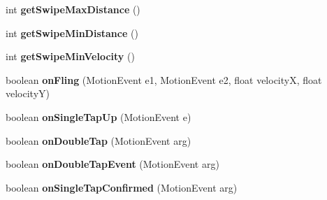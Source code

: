 \begin{DoxyCompactItemize}
\item 
\hypertarget{classcom_1_1chopin_1_1SimpleGestureFilter_a147e3bdf932d1452c54f61c6039d486a}{}int {\bfseries get\+Swipe\+Max\+Distance} ()\label{classcom_1_1chopin_1_1SimpleGestureFilter_a147e3bdf932d1452c54f61c6039d486a}

\item 
\hypertarget{classcom_1_1chopin_1_1SimpleGestureFilter_a808f7f24037e8696afa446691deeb8d6}{}int {\bfseries get\+Swipe\+Min\+Distance} ()\label{classcom_1_1chopin_1_1SimpleGestureFilter_a808f7f24037e8696afa446691deeb8d6}

\item 
\hypertarget{classcom_1_1chopin_1_1SimpleGestureFilter_a094e37dde168c3b7d3c66fc8a9de01a6}{}int {\bfseries get\+Swipe\+Min\+Velocity} ()\label{classcom_1_1chopin_1_1SimpleGestureFilter_a094e37dde168c3b7d3c66fc8a9de01a6}

\item 
\hypertarget{classcom_1_1chopin_1_1SimpleGestureFilter_a1f2c523774430ee76285323825a346b0}{}boolean {\bfseries on\+Fling} (Motion\+Event e1, Motion\+Event e2, float velocity\+X, float velocity\+Y)\label{classcom_1_1chopin_1_1SimpleGestureFilter_a1f2c523774430ee76285323825a346b0}

\item 
\hypertarget{classcom_1_1chopin_1_1SimpleGestureFilter_a4dc6a2c2fba9016084f755b6d2ed81d7}{}boolean {\bfseries on\+Single\+Tap\+Up} (Motion\+Event e)\label{classcom_1_1chopin_1_1SimpleGestureFilter_a4dc6a2c2fba9016084f755b6d2ed81d7}

\item 
\hypertarget{classcom_1_1chopin_1_1SimpleGestureFilter_adf6727b617db482e35bc5a5bde56ed44}{}boolean {\bfseries on\+Double\+Tap} (Motion\+Event arg)\label{classcom_1_1chopin_1_1SimpleGestureFilter_adf6727b617db482e35bc5a5bde56ed44}

\item 
\hypertarget{classcom_1_1chopin_1_1SimpleGestureFilter_a6b5c5b72853b24ddd68f10f8d15dea8e}{}boolean {\bfseries on\+Double\+Tap\+Event} (Motion\+Event arg)\label{classcom_1_1chopin_1_1SimpleGestureFilter_a6b5c5b72853b24ddd68f10f8d15dea8e}

\item 
\hypertarget{classcom_1_1chopin_1_1SimpleGestureFilter_abf7b53665fbe2abd3075e42a5700b962}{}boolean {\bfseries on\+Single\+Tap\+Confirmed} (Motion\+Event arg)\label{classcom_1_1chopin_1_1SimpleGestureFilter_abf7b53665fbe2abd3075e42a5700b962}

\end{DoxyCompactItemize}
